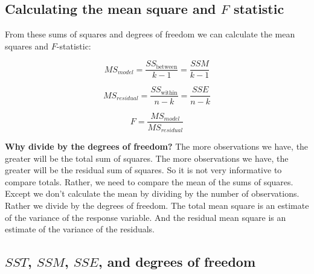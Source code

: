 \documentclass[
  letterpaper,
  8pt,
  a4paper]{book}
\begin{document}
\subsection*{\texorpdfstring{Calculating the mean square and \(F\)
statistic}{Calculating the mean square and F statistic}}\label{calculating-the-mean-square-and-f-statistic}

From these sums of squares and degrees of freedom we can calculate the
mean squares and \(F\)-statistic:

\[MS_{model} = \frac{SS_{\text{between}}}{k-1} = \frac{SSM}{k-1}\]

\[MS_{residual} = \frac{SS_{\text{within}}}{n-k} = \frac{SSE}{n-k}\]

\[F = \frac{MS_{model}}{MS_{residual}}\]

\begin{tcolorbox}[enhanced jigsaw, arc=.35mm, bottomrule=.15mm, bottomtitle=1mm, breakable, colback=white, colbacktitle=quarto-callout-note-color!10!white, colframe=quarto-callout-note-color-frame, coltitle=black, left=2mm, leftrule=.75mm, opacityback=0, opacitybacktitle=0.6, rightrule=.15mm, title=\textcolor{quarto-callout-note-color}{\faInfo}\hspace{0.5em}{Note}, titlerule=0mm, toprule=.15mm, toptitle=1mm]

\textbf{Why divide by the degrees of freedom?} The more observations we
have, the greater will be the total sum of squares. The more
observations we have, the greater will be the residual sum of squares.
So it is not very informative to compare totals. Rather, we need to
compare the mean of the sums of squares. Except we don't calculate the
mean by dividing by the number of observations. Rather we divide by the
degrees of freedom. The total mean square is an estimate of the variance
of the response variable. And the residual mean square is an estimate of
the variance of the residuals.

\end{tcolorbox}

\subsection*{\texorpdfstring{\(SST\), \(SSM\), \(SSE\), and degrees of
freedom}{SST, SSM, SSE, and degrees of freedom}}\label{sst-ssm-sse-and-degrees-of-freedom}
\end{document}
